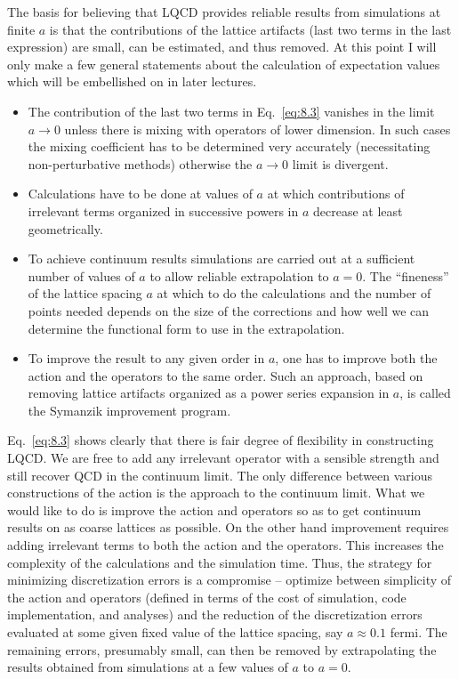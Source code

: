 The basis for believing that LQCD provides reliable results from simulations
at finite $a$ is that the contributions of the lattice artifacts (last two
terms in the last expression) are small, can be estimated, and thus removed.
At this point I will only make a few general statements about the calculation
of expectation values which will be embellished on in later lectures.
\begin{itemize}
\item The contribution of the last two terms in Eq.~\ref{eq:8.3} vanishes in
the limit $a \to 0$ unless there is mixing with operators of lower dimension.
In such cases the mixing coefficient has to be determined very accurately
(necessitating non-perturbative methods) otherwise the $a \to 0$ limit is
divergent.
\item Calculations have to be done at values of $a$ at which contributions of
irrelevant terms organized in successive powers in $a$ decrease at least
geometrically.
\item To achieve continuum results simulations are carried out at a sufficient
number of values of $a$ to allow reliable extrapolation to $a = 0$. The
``fineness'' of the lattice spacing $a$ at which to do the calculations and
the number of points needed depends on the size of the corrections and how
well we can determine the functional form to use in the extrapolation.
\item To improve the result to any given order in $a$, one has to improve both
the action and the operators to the same order. Such an approach, based on
removing lattice artifacts organized as a power series expansion in $a$, is
called the Symanzik improvement program.
\end{itemize}

Eq.~\ref{eq:8.3} shows clearly that there is fair degree of flexibility in
constructing LQCD. We are free to add any irrelevant operator with a sensible
strength and still recover QCD in the continuum limit. The only difference
between various constructions of the action is the approach to the continuum
limit. What we would like to do is improve the action and operators so as to
get continuum results on as coarse lattices as possible. On the other hand
improvement requires adding irrelevant terms to both the action and the
operators. This increases the complexity of the calculations and the
simulation time. Thus, the strategy for minimizing discretization errors is a
compromise -- optimize between simplicity of the action and operators
(defined in terms of the cost of simulation, code implementation, and
analyses) and the reduction of the discretization errors evaluated at some
given fixed value of the lattice spacing, say $a \approx 0.1$ fermi. The
remaining errors, presumably small, can then be removed by extrapolating the
results obtained from simulations at a few values of $a$ to $a = 0$.

